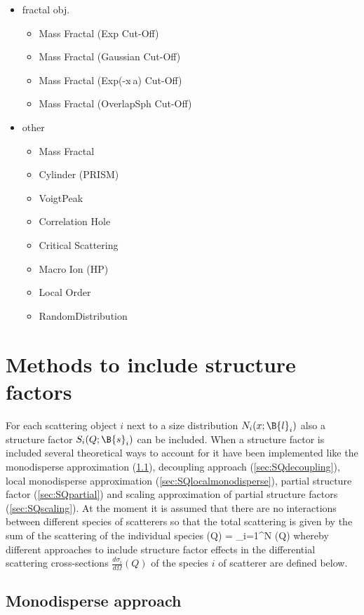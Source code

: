 \begin{itemize}
\begin{itemize}
\end{itemize}
\item fractal obj.
\begin{itemize}
\item Mass Fractal (Exp Cut-Off)
\item Mass Fractal (Gaussian Cut-Off)
\item Mass Fractal (Exp(-x$\hat{~}$a) Cut-Off)
\item Mass Fractal (OverlapSph Cut-Off)
\end{itemize}
\item other
\begin{itemize}
 \item Mass Fractal
 \item Cylinder (PRISM)
 \item VoigtPeak
 \item Correlation Hole
 \item Critical Scattering
 \item Macro Ion (HP)
 \item Local Order
 \item RandomDistribution
\end{itemize}
\end{itemize}

\section{Methods to include structure factors}
For each scattering object $i$ next to a size distribution $N_i(x;\B{l}_i)$ also a
structure factor $S_i(Q;\B{s}_i)$ can be included. When a structure factor is included
several theoretical ways to account for it have been implemented
like the monodisperse approximation (\ref{sec:SQmonodisperse}),
decoupling approach (\ref{sec:SQdecoupling}),
local monodisperse approximation (\ref{sec:SQlocalmonodisperse}),
partial structure factor (\ref{sec:SQpartial})
and scaling approximation of partial structure factors (\ref{sec:SQscaling}).
At the moment it is assumed that there are no interactions between different species
of scatterers so that the total scattering is given by the sum of the scattering of the
individual species
\BE
{}(Q) = \sum\limits_{i=1}^N (Q)
\EE
whereby different approaches to include structure factor effects in
the differential scattering cross-sections $\frac{d\sigma_i}{d\Omega}(Q)$
of the species $i$ of scatterer are defined below.

\subsection{Monodisperse approach}
\label{sec:SQmonodisperse}
~\\

